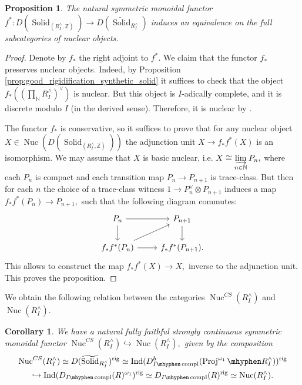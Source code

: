 \documentclass[11pt,leqno]{amsart}
\newtheorem{prop}[theo]{Proposition}
\newtheorem{cor}[theo]{Corollary}
\numberwithin{equation}{section}
\def\N{\mathbb{N}}
\def\Z{\mathbb{Z}}
\def\wt{\widetilde}
\newcommand{\hy}{\mhyphen}
\newcommand{\indlim}[1][]{\mathop{\varinjlim}\limits_{#1}}
\newcommand{\prodd}[1][]{\mathop{\prod}\limits_{#1}}
\newcommand{\hto}{\hookrightarrow}
\newcommand{\rig}{\operatorname{rig}}
\newcommand{\Nuc}{\operatorname{Nuc}}
\newcommand{\Solid}{\operatorname{Solid}}
\newcommand{\Proj}{\operatorname{Proj}}
\newcommand{\Ind}{\operatorname{Ind}}
\newcommand{\compl}{\operatorname{compl}}
\begin{document}
\begin{prop}\label{prop:nuclear_via_synthetic}
The natural symmetric monoidal functor $f^*:D(\Solid_{(R^{\wedge}_I,\Z)})\to D(\wt{\Solid}_{R^{\wedge}_I})$ induces an equivalence on the full subcategories of nuclear objects.
\end{prop}

\begin{proof}
Denote by $f_*$ the right adjoint to $f^*.$ We claim that the functor $f_*$ preserves nuclear objects. Indeed, by Proposition \ref{prop:good_rigidification_synthetic_solid} it suffices to check that the object $f_*((\prodd[\N]R^{\wedge}_I)^{\vee})$ is nuclear. But this object is $I$-adically complete, and it is discrete modulo $I$ (in the derived sense). Therefore, it is nuclear by \cite[Lemma 2.18]{AM24}.

The functor $f_*$ is conservative, so it suffices to prove that for any nuclear object $X\in \Nuc(D(\Solid_{(R^{\wedge}_I,\Z)}))$ the adjunction unit $X\to f_*f^*(X)$ is an isomorphism. We may assume that $X$ is basic nuclear, i.e. $X\cong\indlim[n\in\N]P_n,$ where each $P_n$ is compact and each transition map $P_n\to P_{n+1}$ is trace-class. But then for each $n$ the choice of a trace-class witness $1\to P_n^{\vee}\otimes P_{n+1}$ induces a map $f_*f^*(P_n)\to P_{n+1},$ such that the following diagram commutes:
\begin{equation*}
\begin{tikzcd}
P_n\ar[r]\ar[d] & P_{n+1}\ar[d]\\
f_* f^*(P_n)\ar[r]\ar[ru] & f_*f^*(P_{n+1}).
\end{tikzcd}
\end{equation*}
This allows to construct the map $f_*f^*(X)\to X,$ inverse to the adjunction unit. This proves the proposition.
\end{proof}

We obtain the following relation between the categories $\Nuc^{CS}(R^{\wedge}_I)$ and $\Nuc(R^{\wedge}_I).$

\begin{cor}\label{cor:from_Nuc^CS_to_Nuc}
We have a natural fully faithful strongly continuous symmetric monoidal functor $\Nuc^{CS}(R^{\wedge}_I)\hto \Nuc(R^{\wedge}_I),$ given by the composition
\begin{multline}\label{eq:from_Nuc^CS_to_Nuc}
\Nuc^{CS}(R^{\wedge}_I)\simeq D(\wt{\Solid}_{R^{\wedge}_I})^{\rig}\simeq \Ind(D^b_{I\hy\compl}(\Proj^{\omega_1}\hy R^{\wedge}_I))^{\rig}\\
\hto \Ind(D_{I\hy\compl}(R)^{\omega_1})^{\rig}
\simeq D_{I\hy\compl}(R)^{\rig}\simeq \Nuc(R^{\wedge}_I). 
\end{multline}
\end{cor}
\end{document}
